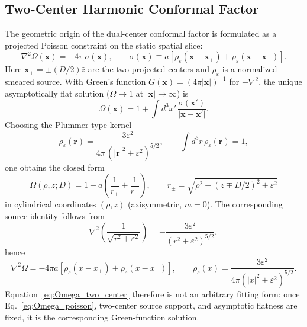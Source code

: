 \documentclass[aps,prd,onecolumn,notitlepage,nofootinbib,superscriptaddress,11pt,floatfix]{revtex4-2}
\begin{document}
\subsection{Two-Center Harmonic Conformal Factor}
\label{sec:two_center}

The geometric origin of the dual-center conformal factor is formulated as a projected Poisson constraint on the static spatial slice:
\begin{equation}
\nabla^2\Omega(\mathbf{x})=-4\pi\,\sigma(\mathbf{x}),\qquad
\sigma(\mathbf{x})\equiv a\!\left[\rho_\varepsilon(\mathbf{x}-\mathbf{x}_+)+\rho_\varepsilon(\mathbf{x}-\mathbf{x}_-)\right].
\label{eq:Omega_poisson}
\end{equation}
Here $\mathbf{x}_\pm=\pm(D/2)\hat z$ are the two projected centers and $\rho_\varepsilon$ is a normalized smeared source. With Green's function $G(\mathbf{x})=(4\pi|\mathbf{x}|)^{-1}$ for $-\nabla^2$, the unique asymptotically flat solution ($\Omega\to1$ at $|\mathbf{x}|\to\infty$) is
\begin{equation}
\Omega(\mathbf{x})=1+\int d^3x'\,\frac{\sigma(\mathbf{x}')}{|\mathbf{x}-\mathbf{x}'|}.
\label{eq:Omega_green}
\end{equation}
Choosing the Plummer-type kernel
\begin{equation}
\rho_\varepsilon(\mathbf{r})=\frac{3\varepsilon^2}{4\pi\,(|\mathbf{r}|^2+\varepsilon^2)^{5/2}},\qquad
\int d^3r\,\rho_\varepsilon(\mathbf{r})=1,
\label{eq:rho_eps_norm}
\end{equation}
one obtains the closed form
\begin{equation}
\boxed{
\Omega(\rho, z; D) = 1 + a \left( \frac{1}{r_+} + \frac{1}{r_-} \right), \qquad r_\pm = \sqrt{\rho^2 + (z \mp D/2)^2 + \varepsilon^2}
}
\label{eq:Omega_two_center}
\end{equation}
in cylindrical coordinates $(\rho,z)$ (axisymmetric, $m=0$). The corresponding source identity follows from
\begin{equation}
\nabla^2\!\left(\frac{1}{\sqrt{r^2+\varepsilon^2}}\right)= -\frac{3\varepsilon^2}{(r^2+\varepsilon^2)^{5/2}},
\label{eq:laplace_plummer}
\end{equation}
hence
\begin{equation}
\nabla^2 \Omega = -4\pi a \left[ \rho_\varepsilon(x - x_+) + \rho_\varepsilon(x - x_-) \right], \qquad \rho_\varepsilon(x) = \frac{3\varepsilon^2}{4\pi (|x|^2 + \varepsilon^2)^{5/2}}.
\end{equation}
Equation~\eqref{eq:Omega_two_center} therefore is not an arbitrary fitting form: once Eq.~\eqref{eq:Omega_poisson}, two-center source support, and asymptotic flatness are fixed, it is the corresponding Green-function solution.
\end{document}
